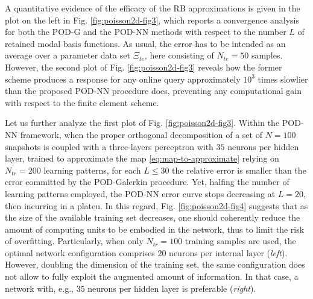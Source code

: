 \documentclass{elsarticle}
\numberwithin{equation}{section}
\theoremstyle{theorem}
\theoremstyle{definition}
\theoremstyle{remark}
\theoremstyle{proposition}
\numberwithin{figure}{section}
\newcommand{\bg}[1]{\boldsymbol{#1}}
\begin{document}
		A quantitative evidence of the efficacy of the RB approximations is given in the plot on the left in Fig. \ref{fig:poisson2d-fig3}, which reports a convergence analysis for both the POD-G and the POD-NN methods with respect to the number $L$ of retained modal basis functions. As usual, the error has to be intended as an average over a parameter data set $\Xi_{te}$, here consisting of $N_{te} = 50$ samples. However, the second plot of Fig. \ref{fig:poisson2d-fig3} reveals how the former scheme produces a response for any online query approximately $10^3$ times slowlier than the proposed POD-NN procedure does, preventing any computational gain with respect to the finite element scheme. %
		
		Let us further analyze the first plot of Fig. \ref{fig:poisson2d-fig3}. Within the POD-NN framework, when the proper orthogonal decomposition of a set of $N = 100$ snapshots is coupled with a three-layers perceptron with $35$ neurons per hidden layer, trained to approximate the map \eqref{eq:map-to-approximate} relying on $N_{tr} = 200$ learning patterns, for each $L \leq 30$ the relative error is smaller than the error committed by the POD-Galerkin procedure. Yet, halfing the number of learning patterns employed, the POD-NN error curve stops decreasing at $L = 20$, then incurring in a plateu. In this regard, Fig. \ref{fig:poisson2d-fig4} suggests that as the size of the available training set decreases, one should coherently reduce the amount of computing units to be embodied in the network, thus to limit the risk of overfitting. Particularly, when only $N_{tr} = 100$ training samples are used, the optimal network configuration comprises $20$ neurons per internal layer (\emph{left}). However, doubling the dimension of the training set, the same configuration does not allow to fully exploit the augmented amount of information. In that case, a network with, e.g., $35$ neurons per hidden layer is preferable (\emph{right}). 
						
\end{document}
